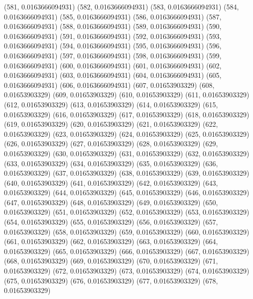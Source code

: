 {					(581, 0.0163666094931)
					(582, 0.0163666094931)
					(583, 0.0163666094931)
					(584, 0.0163666094931)
					(585, 0.0163666094931)
					(586, 0.0163666094931)
					(587, 0.0163666094931)
					(588, 0.0163666094931)
					(589, 0.0163666094931)
					(590, 0.0163666094931)
					(591, 0.0163666094931)
					(592, 0.0163666094931)
					(593, 0.0163666094931)
					(594, 0.0163666094931)
					(595, 0.0163666094931)
					(596, 0.0163666094931)
					(597, 0.0163666094931)
					(598, 0.0163666094931)
					(599, 0.0163666094931)
					(600, 0.0163666094931)
					(601, 0.0163666094931)
					(602, 0.0163666094931)
					(603, 0.0163666094931)
					(604, 0.0163666094931)
					(605, 0.0163666094931)
					(606, 0.0163666094931)
					(607, 0.01653903329)
					(608, 0.01653903329)
					(609, 0.01653903329)
					(610, 0.01653903329)
					(611, 0.01653903329)
					(612, 0.01653903329)
					(613, 0.01653903329)
					(614, 0.01653903329)
					(615, 0.01653903329)
					(616, 0.01653903329)
					(617, 0.01653903329)
					(618, 0.01653903329)
					(619, 0.01653903329)
					(620, 0.01653903329)
					(621, 0.01653903329)
					(622, 0.01653903329)
					(623, 0.01653903329)
					(624, 0.01653903329)
					(625, 0.01653903329)
					(626, 0.01653903329)
					(627, 0.01653903329)
					(628, 0.01653903329)
					(629, 0.01653903329)
					(630, 0.01653903329)
					(631, 0.01653903329)
					(632, 0.01653903329)
					(633, 0.01653903329)
					(634, 0.01653903329)
					(635, 0.01653903329)
					(636, 0.01653903329)
					(637, 0.01653903329)
					(638, 0.01653903329)
					(639, 0.01653903329)
					(640, 0.01653903329)
					(641, 0.01653903329)
					(642, 0.01653903329)
					(643, 0.01653903329)
					(644, 0.01653903329)
					(645, 0.01653903329)
					(646, 0.01653903329)
					(647, 0.01653903329)
					(648, 0.01653903329)
					(649, 0.01653903329)
					(650, 0.01653903329)
					(651, 0.01653903329)
					(652, 0.01653903329)
					(653, 0.01653903329)
					(654, 0.01653903329)
					(655, 0.01653903329)
					(656, 0.01653903329)
					(657, 0.01653903329)
					(658, 0.01653903329)
					(659, 0.01653903329)
					(660, 0.01653903329)
					(661, 0.01653903329)
					(662, 0.01653903329)
					(663, 0.01653903329)
					(664, 0.01653903329)
					(665, 0.01653903329)
					(666, 0.01653903329)
					(667, 0.01653903329)
					(668, 0.01653903329)
					(669, 0.01653903329)
					(670, 0.01653903329)
					(671, 0.01653903329)
					(672, 0.01653903329)
					(673, 0.01653903329)
					(674, 0.01653903329)
					(675, 0.01653903329)
					(676, 0.01653903329)
					(677, 0.01653903329)
					(678, 0.01653903329)
}
